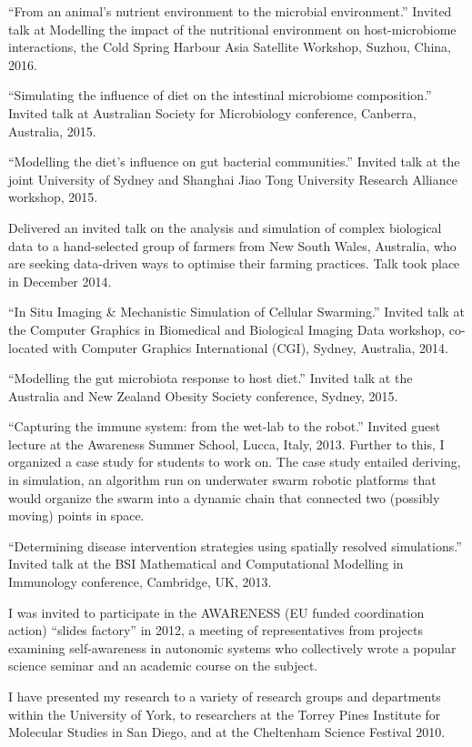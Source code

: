 \documentclass[a4paper]{article}
\begin{document}
``From an animal's nutrient environment to the microbial environment.'' Invited talk at Modelling the impact of the nutritional environment on host-microbiome interactions, the Cold Spring Harbour Asia Satellite Workshop, Suzhou, China, 2016.

``Simulating the influence of diet on the intestinal microbiome composition.'' Invited talk at Australian Society for Microbiology conference, Canberra, Australia, 2015.

``Modelling the diet's influence on gut bacterial communities.'' Invited talk at the joint University of Sydney and Shanghai Jiao Tong University Research Alliance workshop, 2015.

Delivered an invited talk on the analysis and simulation of complex biological data to a hand-selected group of farmers from New South Wales, Australia, who are seeking data-driven ways to optimise their farming practices. Talk took place in December 2014.

``In Situ Imaging \& Mechanistic Simulation of Cellular Swarming.'' Invited talk at the Computer Graphics in Biomedical and Biological Imaging Data workshop, co-located with Computer Graphics International (CGI), Sydney, Australia, 2014.

``Modelling the gut microbiota response to host diet.'' Invited talk at the Australia and New Zealand Obesity Society conference, Sydney, 2015.

``Capturing the immune system: from the wet-lab to the robot.'' Invited guest lecture at the Awareness Summer School, Lucca, Italy, 2013. Further to this, I organized a case study for students to work on. The case study entailed deriving, in simulation, an algorithm run on underwater swarm robotic platforms that would organize the swarm into a dynamic chain that connected two (possibly moving) points in space.

``Determining disease intervention strategies using spatially resolved simulations.'' Invited talk at the BSI Mathematical and Computational Modelling in Immunology conference, Cambridge, UK, 2013.

I was invited to participate in the AWARENESS (EU funded coordination action) ``slides factory'' in 2012, a meeting of representatives from projects examining self-awareness in autonomic systems who collectively wrote a popular science seminar and an academic course on the subject.

I have presented my research to a variety of research groups and departments within the University of York, to researchers at the Torrey Pines Institute for Molecular Studies in San Diego, and at the Cheltenham Science Festival 2010.
\end{document}
